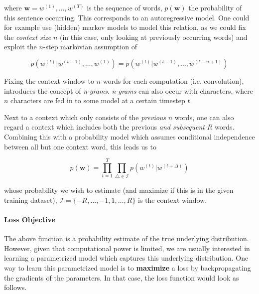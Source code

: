 \documentclass[a4paper,12pt,twoside,openright]{report}
\begin{document}

where $\mathbf{w} = w^{(1)}, \dots, w^{(T)} $ is the sequence of words, $p(\mathbf{w})$ the probability of this sentence occurring.
This corresponds to an autoregressive model.
One could for example use (hidden) markov models to model this relation, as we could fix the \textit{context size} $n$ (in this case, only looking at previously occurring words) and exploit the $n$-step markovian assumption of

\begin{equation}
p\left( w^{(t)} | w^{(t -1)}, \ldots, w^{(1)} \right) = p\left( w^{(t)} | w^{(t -1)}, \ldots, w^{(t - n + 1)} \right)
\end{equation}{\label{eq:naive_sequential_probability_markovian}}

Fixing the context window to $n$ words for each computation (i.e. convolution), introduces the concept of \textit{n-grams}. 
\textit{n-grams} can also occur with characters, where $n$ characters are fed in to some model at a certain timestep $t$.

Next to a context which only consists of the \textit{previous} $n$ words, one can also regard a context which includes both the previous \textit{and subsequent} $R$ words. 
Combining this with a probability model which assumes conditional independence between all but one context word, this leads us to

\begin{equation}
p(\mathbf{w})=\prod_{t=1}^{T} \prod_{\triangle \in \mathcal{I} } p\left( w^{(t)} | w^{(t +\Delta)}\right)
\end{equation}{\label{eq:naive_sequential_probability}}

whose probability we wish to estimate (and maximize if this is in the given training dataset), $\mathcal{I}=\{-R, \ldots,-1,1, \ldots, R\}$ is the context window. 

\paragraph{Loss Objective} The above function is a probability estimate of the true underlying distribution.
However, given that computational power is limited, we are usually interested in learning a parametrized model which captures this underlying distribution.
One way to learn this parametrized model is to \textbf{maximize} a loss by backpropagating the gradients of the parameters.
In that case, the loss function would look as follows.
\end{document}
